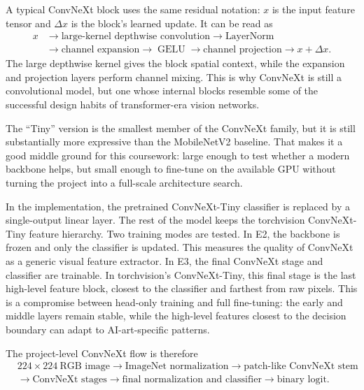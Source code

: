 \documentclass[11pt,a4paper]{article}
\begin{document}
A typical ConvNeXt block uses the same residual notation: \(x\) is the input
feature tensor and \(\Delta x\) is the block's learned update. It can be read
as
\[
  \begin{aligned}
  x
  &\rightarrow
  \text{large-kernel depthwise convolution}
  \rightarrow
  \text{LayerNorm} \\
  &\rightarrow
  \text{channel expansion}
  \rightarrow
  \operatorname{GELU}
  \rightarrow
  \text{channel projection}
  \rightarrow
  x+\Delta x .
  \end{aligned}
\]
The large depthwise kernel gives the block spatial context, while the
expansion and projection layers perform channel mixing. This is why ConvNeXt
is still a convolutional model, but one whose internal blocks resemble some of
the successful design habits of transformer-era vision networks.

The ``Tiny'' version is the smallest member of the ConvNeXt family, but it is
still substantially more expressive than the MobileNetV2 baseline. That makes
it a good middle ground for this coursework: large enough to test whether a
modern backbone helps, but small enough to fine-tune on the available GPU
without turning the project into a full-scale architecture search.

In the implementation, the pretrained ConvNeXt-Tiny classifier is replaced by
a single-output linear layer. The rest of the model keeps the torchvision
ConvNeXt-Tiny feature hierarchy. Two training modes are tested. In E2, the
backbone is frozen and only the classifier is updated. This measures the
quality of ConvNeXt as a generic visual feature extractor. In E3, the final
ConvNeXt stage and classifier are trainable. In torchvision's ConvNeXt-Tiny,
this final stage is the last high-level feature block, closest to the
classifier and farthest from raw pixels. This is a compromise between
head-only training and full fine-tuning: the early and middle layers remain
stable, while the high-level features closest to the decision boundary can
adapt to AI-art-specific patterns.

The project-level ConvNeXt flow is therefore
\[
  \begin{aligned}
  &224{\times}224\ \text{RGB image}
  \rightarrow
  \text{ImageNet normalization}
  \rightarrow
  \text{patch-like ConvNeXt stem} \\
  &\rightarrow
  \text{ConvNeXt stages}
  \rightarrow
  \text{final normalization and classifier}
  \rightarrow
  \text{binary logit}.
  \end{aligned}
\]
\end{document}
